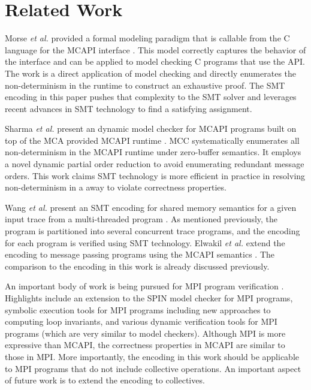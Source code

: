 \section{Related Work}
Morse \emph{et al.} provided a formal modeling paradigm that is callable from
the C language for the MCAPI interface \cite{morse:vmcai12}. This
model correctly captures the behavior of the interface and can be
applied to model checking C programs that use the API. The work is a
direct application of model checking and directly enumerates the
non-determinism in the runtime to construct an exhaustive proof. The
SMT encoding in this paper pushes that complexity to the SMT solver
and leverages recent advances in SMT technology to find a satisfying
assignment.

Sharma \emph{et al.} present an dynamic model checker for MCAPI programs built
on top of the MCA provided MCAPI runtime \cite{sharma:fmcad09}. MCC
systematically enumerates all non-determinism in the MCAPI runtime
under zero-buffer semantics. It employs a novel dynamic partial order
reduction to avoid enumerating redundant message orders. This work
claims SMT technology is more efficient in practice in resolving
non-determinism in a away to violate correctness properties.

Wang \emph{et al.} present an SMT encoding for shared memory semantics for a
given input trace from a multi-threaded program \cite{wang:fse09}. As
mentioned previously, the program is partitioned into several
concurrent trace programs, and the encoding for each program is
verified using SMT technology. Elwakil \emph{et al.} extend the encoding to
message passing programs using the MCAPI semantics
\cite{elwakil:atva10,elwakil:padtad10}. The comparison to the encoding
in this work is already discussed previously.

An important body of work is being pursued for MPI program
verification \cite{siegel-zirkel:2012:loops,
  siegel-zirkel:2011:ppopp,siegel-gopalakrishnan:2011:vmcai,siegel:2007:tutorial,DBLP:conf/ptw/VoVG09,sarvani:fm09,flanagan:popl05}.
Highlights include an extension to the SPIN model checker for MPI
programs, symbolic execution tools for MPI programs including new
approaches to computing loop invariants, and various dynamic
verification tools for MPI programs (which are very similar to model
checkers). Although MPI is more expressive than MCAPI, the correctness
properties in MCAPI are similar to those in MPI. More importantly, the
encoding in this work should be applicable to MPI programs that do not
include collective operations. An important aspect of future work is
to extend the encoding to collectives. 

